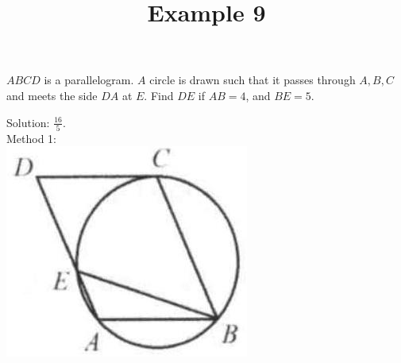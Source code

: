 \documentclass{article}
\title{Example 9}
\date{}
\begin{document}
\maketitle

\(A B C D\) is a parallelogram. \(A\) circle is drawn such that it passes through \(A, B, C\) and meets the side \(D A\) at \(E\). Find \(D E\) if \(A B=4\), and \(B E=5\).

Solution: \(\frac{16}{5}\).\\
Method 1:\\
\centering
\includegraphics[width=\textwidth]{images/167.jpg}
\end{document}
